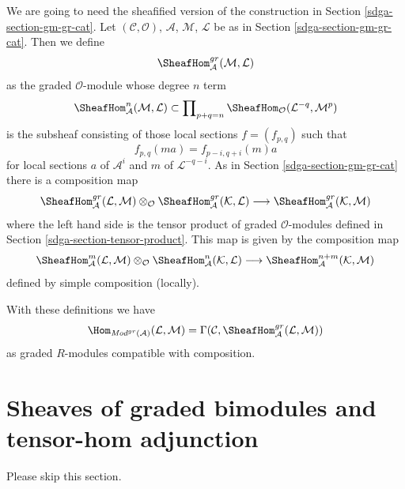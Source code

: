 \medskip\noindent
We are going to need the sheafified version of the construction
in Section \ref{sdga-section-gm-gr-cat}.
Let $(\mathcal{C}, \mathcal{O})$, $\mathcal{A}$,
$\mathcal{M}$, $\mathcal{L}$ be as in Section \ref{sdga-section-gm-gr-cat}.
Then we define
$$
\SheafHom^{gr}_\mathcal{A}(\mathcal{M}, \mathcal{L})
$$
as the graded $\mathcal{O}$-module whose degree $n$ term
$$
\SheafHom^n_\mathcal{A}(\mathcal{M}, \mathcal{L})
\subset
\prod\nolimits_{p + q = n}
\SheafHom_\mathcal{O}(\mathcal{L}^{-q}, \mathcal{M}^p)
$$
is the subsheaf consisting of those local sections $f = (f_{p, q})$ such that
$$
f_{p, q}(m a) = f_{p - i, q + i}(m)a
$$
for local sections $a$ of $\mathcal{A}^i$ and
$m$ of $\mathcal{L}^{-q - i}$. As in Section \ref{sdga-section-gm-gr-cat}
there is a composition map
$$
\SheafHom^{gr}_\mathcal{A}(\mathcal{L}, \mathcal{M}) \otimes_\mathcal{O}
\SheafHom^{gr}_\mathcal{A}(\mathcal{K}, \mathcal{L})
\longrightarrow
\SheafHom^{gr}_\mathcal{A}(\mathcal{K}, \mathcal{M})
$$
where the left hand side is the tensor product of graded $\mathcal{O}$-modules
defined in Section \ref{sdga-section-tensor-product}.
This map is given by the composition map
$$
\SheafHom^m_\mathcal{A}(\mathcal{L}, \mathcal{M}) \otimes_\mathcal{O}
\SheafHom^n_\mathcal{A}(\mathcal{K}, \mathcal{L}) \longrightarrow
\SheafHom^{n + m}_\mathcal{A}(\mathcal{K}, \mathcal{M})
$$
defined by simple composition (locally).

\medskip\noindent
With these definitions we have
$$
\Hom_{\textit{Mod}^{gr}(\mathcal{A})}(\mathcal{L}, \mathcal{M}) =
\Gamma(\mathcal{C}, \SheafHom^{gr}_\mathcal{A}(\mathcal{L}, \mathcal{M}))
$$
as graded $R$-modules compatible with composition.

\section{Sheaves of graded bimodules and tensor-hom adjunction}
\label{sdga-section-graded-bimodules}
Please skip this section.

